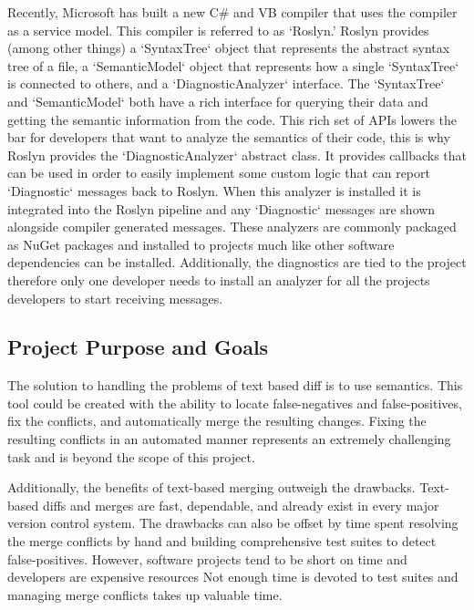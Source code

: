 \documentclass[draftclsnofoot,onecolumn]{IEEEtran}
\begin{document}
Recently, Microsoft has built a new C\# and VB compiler that uses the compiler 
as a service model. This compiler is referred to as ‘Roslyn.’ Roslyn provides 
(among other things) a `SyntaxTree` object that represents the abstract syntax 
tree of a file, a `SemanticModel` object that represents how a single 
`SyntaxTree` is connected to others, and a `DiagnosticAnalyzer` interface. The 
`SyntaxTree` and `SemanticModel` both have a rich interface for querying their 
data and getting the semantic information from the code. This rich set of APIs 
lowers the bar for developers that want to analyze the semantics of their code, 
this is why Roslyn provides the `DiagnosticAnalyzer` abstract class. It 
provides callbacks that can be used in order to easily implement some custom 
logic that can report `Diagnostic` messages back to Roslyn. When this analyzer 
is installed it is integrated into the Roslyn pipeline and any `Diagnostic` 
messages are shown alongside compiler generated messages. These analyzers are 
commonly packaged as NuGet packages and installed to projects much like other 
software dependencies can be installed. Additionally, the diagnostics are tied 
to the project therefore only one developer needs to install an analyzer for 
all the projects developers to start receiving messages.

\subsection{Project Purpose and Goals}%

The solution to handling the problems of text based diff is to use semantics. 
This tool could be created with the ability to locate false-negatives and 
false-positives, fix the conflicts, and automatically merge the resulting 
changes. Fixing the resulting conflicts in an automated manner represents an 
extremely challenging task and is beyond the scope of this project.

Additionally, the benefits of text-based merging outweigh the drawbacks. 
Text-based diffs and merges are fast, dependable, and already exist in every 
major version control system. The drawbacks can also be offset by time spent 
resolving the merge conflicts by hand and building comprehensive test suites to 
detect false-positives. However, software projects tend to be short on time and 
developers are expensive resources Not enough time is devoted to test suites 
and managing merge conflicts takes up valuable time.
\end{document}
